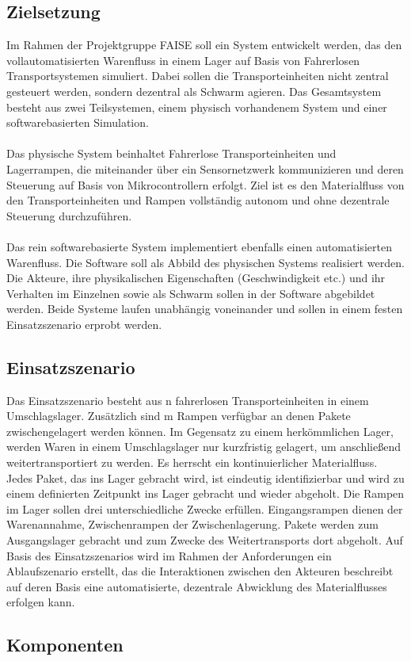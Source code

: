 \subsection{Zielsetzung}
Im Rahmen der Projektgruppe FAISE soll ein System entwickelt werden, das den vollautomatisierten Warenfluss in einem Lager auf Basis von Fahrerlosen Transportsystemen simuliert. Dabei sollen die Transporteinheiten nicht zentral gesteuert werden, sondern dezentral als Schwarm agieren.
Das Gesamtsystem besteht aus zwei Teilsystemen, einem physisch vorhandenem System und einer softwarebasierten Simulation. 
\\\\
Das physische System beinhaltet Fahrerlose Transporteinheiten und Lagerrampen, die miteinander über ein Sensornetzwerk kommunizieren und deren Steuerung auf Basis von Mikrocontrollern erfolgt. Ziel ist es den Materialfluss von den Transporteinheiten und Rampen vollständig autonom und ohne dezentrale Steuerung durchzuführen. 
\\\\
Das rein softwarebasierte System implementiert ebenfalls einen automatisierten Warenfluss. Die Software soll als Abbild des physischen Systems realisiert werden. Die Akteure, ihre physikalischen Eigenschaften (Geschwindigkeit etc.) und ihr Verhalten im Einzelnen sowie als Schwarm sollen in der Software abgebildet werden. Beide Systeme laufen unabhängig voneinander und sollen in einem festen Einsatzszenario erprobt werden.

\subsection{Einsatzszenario}\label{Einsatzszenario} 
Das Einsatzszenario besteht aus n fahrerlosen Transporteinheiten in einem Umschlagslager. Zusätzlich sind m Rampen verfügbar an denen Pakete zwischengelagert werden können. Im Gegensatz zu einem herkömmlichen Lager, werden Waren in einem Umschlagslager nur kurzfristig gelagert, um anschließend weitertransportiert zu werden. Es herrscht ein kontinuierlicher Materialfluss. Jedes Paket, das ins Lager gebracht wird, ist eindeutig identifizierbar und wird zu einem definierten Zeitpunkt ins Lager gebracht und wieder abgeholt. Die Rampen im Lager sollen drei unterschiedliche Zwecke erfüllen. Eingangsrampen dienen der Warenannahme, Zwischenrampen der Zwischenlagerung. Pakete werden zum Ausgangslager gebracht und zum Zwecke des Weitertransports dort abgeholt. Auf Basis des Einsatzszenarios wird im Rahmen der Anforderungen ein Ablaufszenario erstellt, das die Interaktionen zwischen den Akteuren beschreibt auf deren Basis eine automatisierte, dezentrale Abwicklung des Materialflusses erfolgen kann.

\subsection{Komponenten}
  
